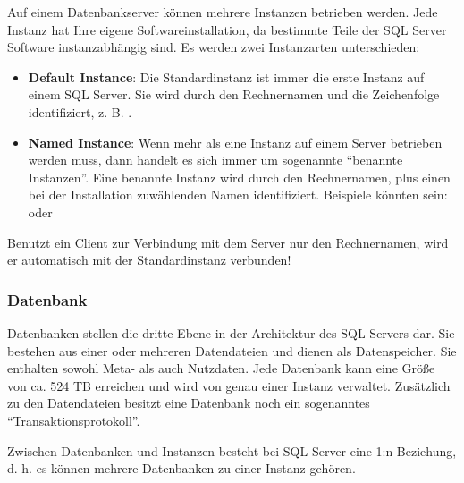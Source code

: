           Auf einem Datenbankserver können mehrere Instanzen betrieben
          werden. Jede Instanz hat Ihre eigene Softwareinstallation, da
          bestimmte Teile der SQL Server Software instanzabhängig sind. Es
          werden zwei Instanzarten unterschieden:
          \begin{itemize}
              \item \textbf{Default Instance}: Die Standardinstanz ist immer die
              erste Instanz auf einem SQL Server. Sie wird durch den
              Rechnernamen und die Zeichenfolge 
              identifiziert, z. B.
              .
              \item \textbf{Named Instance}: Wenn mehr als eine Instanz auf
              einem Server betrieben werden muss, dann handelt es sich immer um
              sogenannte \enquote{benannte Instanzen}. Eine benannte Instanz
              wird durch den Rechnernamen, plus einen bei der Installation
              zuwählenden Namen identifiziert. Beispiele könnten sein:
               oder
          \end{itemize}
          \begin{merke}
            Benutzt ein Client zur Verbindung mit dem Server nur den
            Rechnernamen, wird er automatisch mit der Standardinstanz verbunden!
          \end{merke}
        \subsubsection{Datenbank}
          Datenbanken stellen die dritte Ebene in der Architektur des SQL       
          Servers dar. Sie bestehen aus einer oder mehreren Datendateien und
          dienen als Datenspeicher. Sie enthalten sowohl Meta- als auch
          Nutzdaten. Jede Datenbank kann eine Größe von ca. 524 TB
          erreichen und wird von genau einer Instanz verwaltet. Zusätzlich zu
          den Datendateien besitzt eine Datenbank noch ein sogenanntes
          \enquote{Transaktionsprotokoll}.
          \begin{merke}
            Zwischen Datenbanken und Instanzen besteht bei SQL Server eine 1:n
            Beziehung, d. h. es können mehrere Datenbanken zu einer Instanz
            gehören.
          \end{merke}
\clearpage
